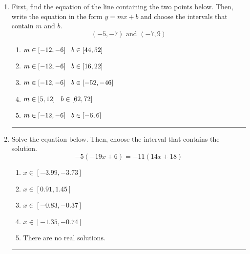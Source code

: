 \documentclass[14pt]{extbook}
\newcommand{\litem}[1]{\item#1\hspace*{-1cm}\rule{\textwidth}{0.4pt}}
\begin{document}
\begin{enumerate}
\litem{
First, find the equation of the line containing the two points below. Then, write the equation in the form $ y=mx+b $ and choose the intervals that contain $m$ and $b$.\[ (-5, -7) \text{ and } (-7, 9) \]\begin{enumerate}[label=\Alph*.]
\item \( m \in [-12, -6] \hspace*{3mm} b \in [44, 52] \)
\item \( m \in [-12, -6] \hspace*{3mm} b \in [16, 22] \)
\item \( m \in [-12, -6] \hspace*{3mm} b \in [-52, -46] \)
\item \( m \in [5, 12] \hspace*{3mm} b \in [62, 72] \)
\item \( m \in [-12, -6] \hspace*{3mm} b \in [-6, 6] \)

\end{enumerate} }
\litem{
Solve the equation below. Then, choose the interval that contains the solution.\[ -5(-19x + 6) = -11(14x + 18) \]\begin{enumerate}[label=\Alph*.]
\item \( x \in [-3.99, -3.73] \)
\item \( x \in [0.91, 1.45] \)
\item \( x \in [-0.83, -0.37] \)
\item \( x \in [-1.35, -0.74] \)
\item \( \text{There are no real solutions.} \)


\end{enumerate}}
\end{enumerate}
\end{document}
